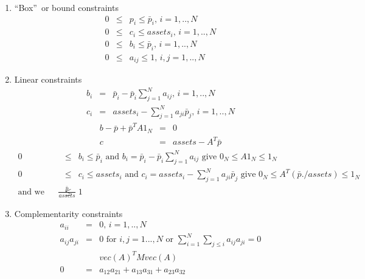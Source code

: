 \documentclass{article}
\begin{document}
\begin{enumerate}
\item \textquotedblleft Box\textquotedblright\ or bound constraints%
\begin{eqnarray*}
0 &\leq &p_{i}\leq \bar{p}_{i}\text{, }i=1,..,N \\
0 &\leq &c_{i}\leq assets_{i}\text{, }i=1,..,N \\
0 &\leq &b_{i}\leq \bar{p}_{i}\text{, }i=1,..,N \\
0 &\leq &a_{ij}\leq 1\text{, }i,j=1,..,N
\end{eqnarray*}

\item Linear constraints%
\begin{eqnarray*}
b_{i} &=&\bar{p}_{i}-\bar{p}_{i}\sum_{j=1}^{N}a_{ij}\text{, }i=1,..,N \\
c_{i} &=&assets_{i}-\sum_{j=1}^{N}a_{ji}\bar{p}_{j}\text{, }i=1,..,N
\end{eqnarray*}%
\begin{eqnarray*}
b-\bar{p}+\bar{p}^{T}A1_{N} &=&0 \\
c &=&assets-A^{T}\bar{p}
\end{eqnarray*}%
\begin{eqnarray*}
0 &\leq &b_{i}\leq \bar{p}_{i}\text{ and }b_{i}=\bar{p}_{i}-\bar{p}%
_{i}\sum_{j=1}^{N}a_{ij}\text{ give }0_{N}\leq A1_{N}\leq 1_{N} \\
0 &\leq &c_{i}\leq assets_{i}\text{ and }c_{i}=assets_{i}-%
\sum_{j=1}^{N}a_{ji}\bar{p}_{j}\text{ give }0_{N}\leq A^{T}\left( \bar{p}%
./assets\right) \leq 1_{N} \\
\text{and we know }\frac{\bar{p}}{assets} &\leq &1
\end{eqnarray*}

\item Complementarity constraints%
\begin{eqnarray*}
a_{ii} &=&0\text{, }i=1,..,N \\
a_{ij}a_{ji} &=&0\text{ for }i,j=1...,N\text{ or }\sum_{i=1}^{N}\sum_{j\leq
i}a_{ij}a_{ji}=0 \\
&&vec\left( A\right) ^{T}Mvec\left( A\right) \\
0 &=&a_{12}a_{21}+a_{13}a_{31}+a_{23}a_{32}
\end{eqnarray*}


\end{enumerate}
\end{document}
